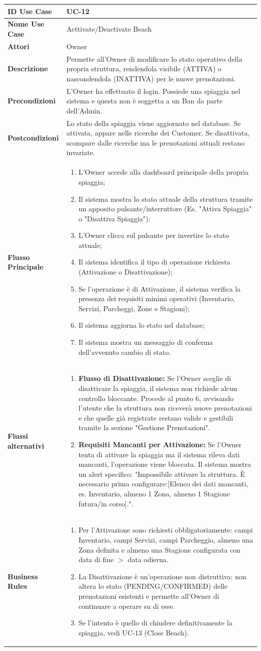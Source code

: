 \documentclass{article}
\newcommand{\usecasetable}[9]{
	\begin{table}[h!]
		\centering
		\footnotesize
		\renewcommand{\arraystretch}{1.4}
		\begin{tabularx}{\textwidth}{|l|>{\raggedright\arraybackslash}X|}
			\hline
			\textbf{ID Use Case} & #1 \\ \hline
			\textbf{Nome Use Case} & #2 \\ \hline
			\textbf{Attori} & #3 \\ \hline
			\textbf{Descrizione} & #4 \\ \hline
			\textbf{Precondizioni} & #5 \\ \hline
			\textbf{Postcondizioni} & #6 \\ \hline
			\textbf{Flusso Principale} & #7 \\ \hline
			\textbf{Flussi alternativi} & #8 \\ \hline
			\textbf{Business Rules} & #9 \\ \hline
		\end{tabularx}
	\end{table}
}
\begin{document}
	\usecasetable
	{UC-12}
	{Acttivate/Deactivate Beach}
	{Owner}
	{Permette all'Owner di modificare lo stato operativo della propria struttura, rendendola visibile (ATTIVA) o nascondendola (INATTIVA) per le nuove prenotazioni.}
	{L'Owner ha effettuato il login. Possiede una spiaggia nel sistema e questa non è soggetta a un Ban da parte dell'Admin.}
	{Lo stato della spiaggia viene aggiornato nel database. Se attivata, appare nelle ricerche dei Customer. Se disattivata, scompare dalle ricerche ma le prenotazioni attuali restano invariate.}
	{
		\begin{enumerate}[nosep, leftmargin=*]
			\item L'Owner accede alla dashboard principale della propria spiaggia;
			\item Il sistema mostra lo stato attuale della struttura tramite un apposito pulsante/interruttore (Es. "Attiva Spiaggia" o "Disattiva Spiaggia");
			\item L'Owner clicca sul pulsante per invertire lo stato attuale;
			\item Il sistema identifica il tipo di operazione richiesta (Attivazione o Disattivazione);
			\item Se l'operazione è di Attivazione, il sistema verifica la presenza dei requisiti minimi operativi (Inventario, Servizi, Parcheggi, Zone e Stagioni);
			\item Il sistema aggiorna lo stato nel database;
			\item Il sistema mostra un messaggio di conferma dell'avvenuto cambio di stato.
		\end{enumerate}
	}
	{
		\begin{enumerate}[nosep, leftmargin=25px]
			\item[\textbf{4a.}] \textbf{Flusso di Disattivazione:} Se l'Owner sceglie di disattivare la spiaggia, il sistema non richiede alcun controllo bloccante. Procede al punto 6, avvisando l'utente che la struttura non riceverà nuove prenotazioni e che quelle già registrate restano valide e gestibili tramite la sezione "Gestione Prenotazioni".
			\item[\textbf{5a-e.}] \textbf{Requisiti Mancanti per Attivazione:} Se l'Owner tenta di attivare la spiaggia ma il sistema rileva dati mancanti, l'operazione viene bloccata. Il sistema mostra un alert specifico: "Impossibile attivare la struttura. È necessario prima configurare:[Elenco dei dati mancanti, es. Inventario, almeno 1 Zona, almeno 1 Stagione futura/in corso].".
		\end{enumerate}
	}
	{
		\begin{enumerate}[nosep, leftmargin=*]
			\item[•] Per l'Attivazione sono richiesti obbligatoriamente: campi Inventario, campi Servizi, campi Parcheggio, almeno una Zona definita e almeno una Stagione configurata con data di fine $>$ data odierna.
			\item[•] La Disattivazione è un'operazione non distruttiva: non altera lo stato (PENDING/CONFIRMED) delle prenotazioni esistenti e permette all'Owner di continuare a operare su di esse.
			\item[•] Se l'intento è quello di chiudere definitivamente la spiaggia, vedi UC-13 (Close Beach).
		\end{enumerate}
	}
\end{document}
